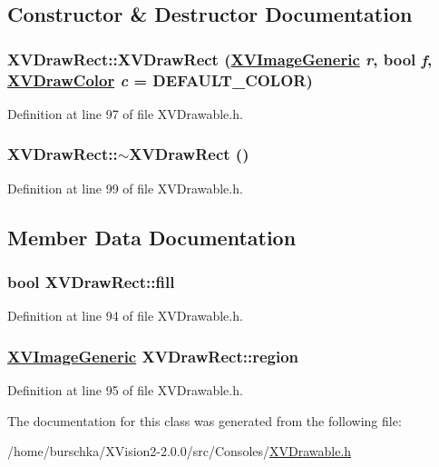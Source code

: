 \subsection{Constructor \& Destructor Documentation}
\label{XVDrawRect_a0}
\hypertarget{class_XVDrawRect_a0}{
\subsubsection[XVDrawRect]{\setlength{\rightskip}{0pt plus 5cm}XVDraw\-Rect::XVDraw\-Rect (\hyperlink{class_XVImageGeneric}{XVImage\-Generic} {\em r}, bool {\em f}, \hyperlink{class_XVDrawColor}{XVDraw\-Color} {\em c} = DEFAULT\_\-COLOR)}}




Definition at line 97 of file XVDrawable.h.\label{XVDrawRect_a1}
\hypertarget{class_XVDrawRect_a1}{
\subsubsection[~XVDrawRect]{\setlength{\rightskip}{0pt plus 5cm}XVDraw\-Rect::$\sim$XVDraw\-Rect ()}}




Definition at line 99 of file XVDrawable.h.

\subsection{Member Data Documentation}
\label{XVDrawRect_m0}
\hypertarget{class_XVDrawRect_m0}{
\subsubsection[fill]{\setlength{\rightskip}{0pt plus 5cm}bool XVDraw\-Rect::fill}}




Definition at line 94 of file XVDrawable.h.\label{XVDrawRect_m1}
\hypertarget{class_XVDrawRect_m1}{
\subsubsection[region]{\setlength{\rightskip}{0pt plus 5cm}\hyperlink{class_XVImageGeneric}{XVImage\-Generic} XVDraw\-Rect::region}}




Definition at line 95 of file XVDrawable.h.

The documentation for this class was generated from the following file:\begin{CompactItemize}
\item 
/home/burschka/XVision2-2.0.0/src/Consoles/\hyperlink{XVDrawable.h-source}{XVDrawable.h}\end{CompactItemize}
